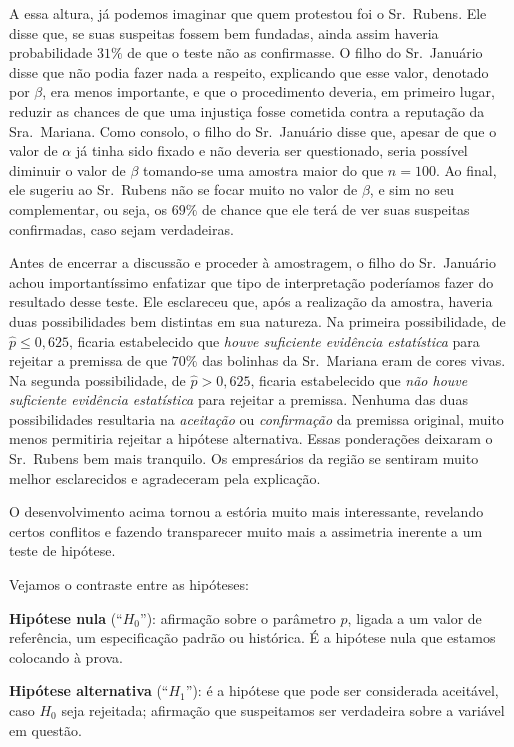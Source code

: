 \documentclass[12pt,a4paper]{article}
\theoremstyle{plain}
\theoremstyle{definition}
\theoremstyle{remark}
\newenvironment{example}{\pushQED{\qed}\renewcommand{\qedsymbol}{\scriptsize$\triangle$}\examplex}{\popQED\endexamplex}
\begin{document}
\begin{example}
A essa altura, já podemos imaginar que quem protestou foi o Sr.~Rubens.
Ele disse que, se suas suspeitas fossem bem fundadas, ainda assim haveria probabilidade $31\%$ de que o teste não as confirmasse.
O filho do Sr.~Januário disse que não podia fazer nada a respeito, explicando que esse valor, denotado por $\beta$, era menos importante, e que o procedimento deveria, em primeiro lugar, reduzir as chances de que uma injustiça fosse cometida contra a reputação da Sra.~Mariana.
Como consolo, o filho do Sr.~Januário disse que, apesar de que o valor de $\alpha$ já tinha sido fixado e não deveria ser questionado, seria possível diminuir o valor de $\beta$ tomando-se uma amostra maior do que $n=100$.
Ao final, ele sugeriu ao Sr.~Rubens não se focar muito no valor de $\beta$, e sim no seu complementar, ou seja, os $69\%$ de chance que ele terá de ver suas suspeitas confirmadas, caso sejam verdadeiras.

Antes de encerrar a discussão e proceder à amostragem, o filho do Sr.~Januário achou importantíssimo enfatizar que tipo de interpretação poderíamos fazer do resultado desse teste.
Ele esclareceu que, após a realização da amostra, haveria duas possibilidades bem distintas em sua natureza.
Na primeira possibilidade, de $\hat{p} \leq 0,625$, ficaria estabelecido que \emph{houve suficiente evidência estatística} para rejeitar a premissa de que $70\%$ das bolinhas da Sr.~Mariana eram de cores vivas.
Na segunda possibilidade, de $\hat{p} > 0,625$, ficaria estabelecido que \emph{não houve suficiente evidência estatística} para rejeitar a premissa.
Nenhuma das duas possibilidades resultaria na \emph{aceitação} ou \emph{confirmação} da premissa original, muito menos permitiria rejeitar a hipótese alternativa.
Essas ponderações deixaram o Sr.~Rubens bem mais tranquilo.
Os empresários da região se sentiram muito melhor esclarecidos e agradeceram pela explicação.
\end{example}

O desenvolvimento acima tornou a estória muito mais interessante, revelando certos conflitos e fazendo transparecer muito mais a assimetria inerente a um teste de hipótese.

Vejamos o contraste entre as hipóteses:

\textbf{Hipótese nula} (``$H_0$''): afirmação sobre o parâmetro $p$, ligada a um valor de referência, um especificação padrão ou histórica. É a hipótese nula que estamos colocando à prova.

\textbf{Hipótese alternativa}  (``$H_1$''): é a hipótese que pode ser considerada aceitável, caso $H_0$ seja rejeitada; afirmação que suspeitamos ser verdadeira sobre a variável em questão.
\end{document}
